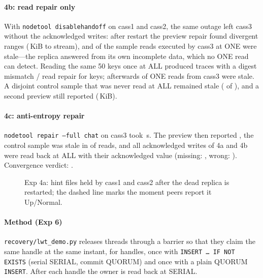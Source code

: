 \paragraph{4b: read repair only}
With \texttt{nodetool disablehandoff} on cass1 and cass2, the same outage left cass3 without
the  acknowledged writes: after restart the preview repair found
 divergent ranges (\,KiB to stream), and
 of the  sample reads executed by
cass3 at ONE were stale---the replica answered from its own incomplete data, which no ONE read
can detect. Reading the same 50 keys once at ALL produced traces with a digest mismatch / read
repair for  keys; afterwards  of
 ONE reads from cass3 were stale. A disjoint control sample that was
never read at ALL remained stale ( of ),
and a second preview still reported  (\,KiB).

\paragraph{4c: anti-entropy repair}
\texttt{nodetool repair --full chat} on cass3 took \,s. The preview then
reported , the control sample was stale in  of
 reads, and all  acknowledged writes of 4a
and 4b were read back at ALL with their acknowledged value (missing: ,
wrong: ).  Convergence verdict:
\textbf{}.

\begin{figure}[t]\centering
{}
\caption{Exp 4a: hint files held by cass1 and cass2 after the dead replica is restarted; the
dashed line marks the moment peers report it Up/Normal.}\label{fig:hints}
\end{figure}

\paragraph{Method (Exp 6)}
\texttt{recovery/lwt\_demo.py} releases  threads through a barrier so that
they claim the same handle at the same instant, for  handles, once with
\texttt{INSERT \ldots\ IF NOT EXISTS} (serial SERIAL, commit QUORUM) and once with a plain
QUORUM \texttt{INSERT}. After each handle the owner is read back at SERIAL.

